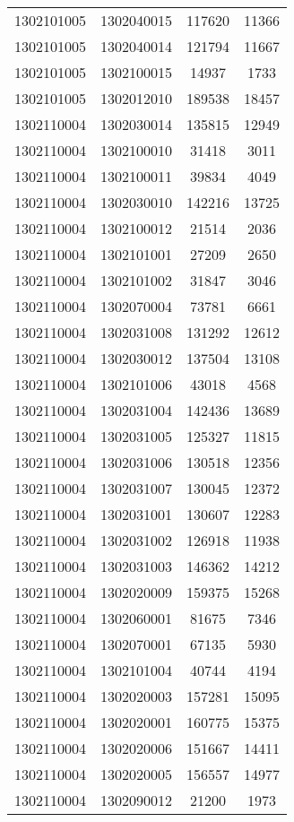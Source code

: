 \begin{longtable}[h]{llcc}
		1302101005 & 1302040015 & 117620 & 11366\\
		1302101005 & 1302040014 & 121794 & 11667\\
		1302101005 & 1302100015 & 14937 & 1733\\
		1302101005 & 1302012010 & 189538 & 18457\\
		1302110004 & 1302030014 & 135815 & 12949\\
		1302110004 & 1302100010 & 31418 & 3011\\
		1302110004 & 1302100011 & 39834 & 4049\\
		1302110004 & 1302030010 & 142216 & 13725\\
		1302110004 & 1302100012 & 21514 & 2036\\
		1302110004 & 1302101001 & 27209 & 2650\\
		1302110004 & 1302101002 & 31847 & 3046\\
		1302110004 & 1302070004 & 73781 & 6661\\
		1302110004 & 1302031008 & 131292 & 12612\\
		1302110004 & 1302030012 & 137504 & 13108\\
		1302110004 & 1302101006 & 43018 & 4568\\
		1302110004 & 1302031004 & 142436 & 13689\\
		1302110004 & 1302031005 & 125327 & 11815\\
		1302110004 & 1302031006 & 130518 & 12356\\
		1302110004 & 1302031007 & 130045 & 12372\\
		1302110004 & 1302031001 & 130607 & 12283\\
		1302110004 & 1302031002 & 126918 & 11938\\
		1302110004 & 1302031003 & 146362 & 14212\\
		1302110004 & 1302020009 & 159375 & 15268\\
		1302110004 & 1302060001 & 81675 & 7346\\
		1302110004 & 1302070001 & 67135 & 5930\\
		1302110004 & 1302101004 & 40744 & 4194\\
		1302110004 & 1302020003 & 157281 & 15095\\
		1302110004 & 1302020001 & 160775 & 15375\\
		1302110004 & 1302020006 & 151667 & 14411\\
		1302110004 & 1302020005 & 156557 & 14977\\
		1302110004 & 1302090012 & 21200 & 1973\\

\end{longtable}

